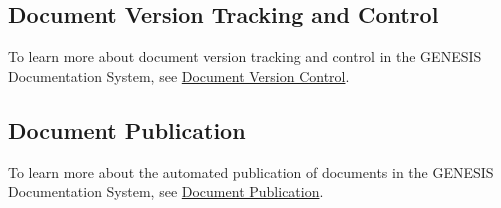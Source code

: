 \documentclass[12pt]{article}
\begin{document}
\subsection*{Document Version Tracking and Control}

To learn more about document version tracking and control in the GENESIS Documentation System, see \href{../version-control/version-control.tex}{Document Version Control}.

\subsection*{Document Publication}

To learn more about the automated publication of documents in the GENESIS Documentation System, see \href{../publication/publication.tex}{Document Publication}.
\end{document}
